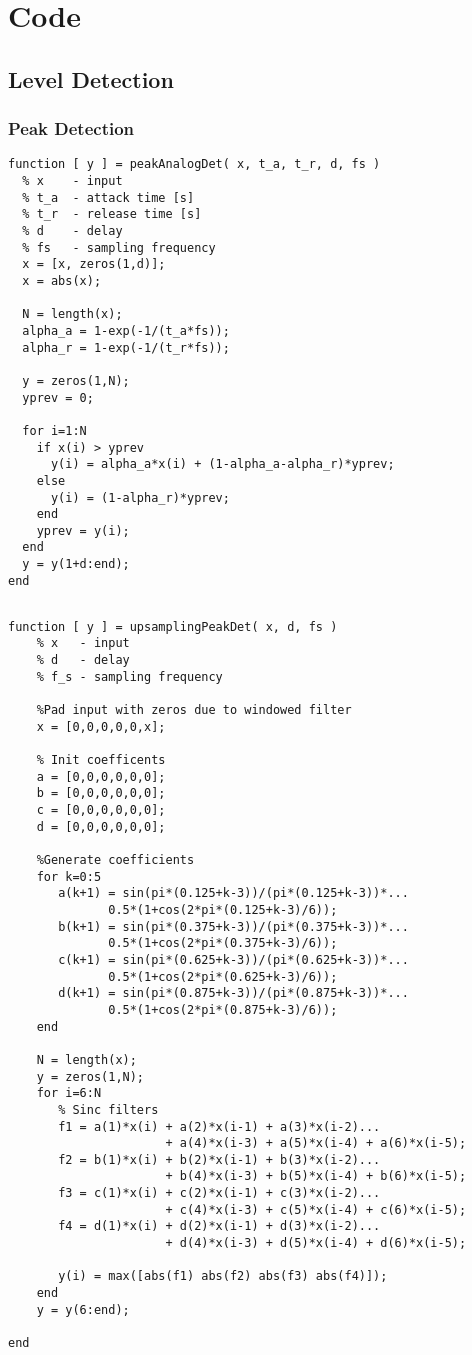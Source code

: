 \documentclass[../main2.tex]{subfiles}
\begin{document}
\section{Code}\label{appendix_code}
\subsection{Level Detection}
\subsubsection{Peak Detection}
\begin{lstlisting}[style=customc]
function [ y ] = peakAnalogDet( x, t_a, t_r, d, fs )
  % x    - input
  % t_a  - attack time [s]
  % t_r  - release time [s]
  % d    - delay
  % fs   - sampling frequency 
  x = [x, zeros(1,d)];
  x = abs(x);
    
  N = length(x);
  alpha_a = 1-exp(-1/(t_a*fs));
  alpha_r = 1-exp(-1/(t_r*fs));
    
  y = zeros(1,N);
  yprev = 0;
  
  for i=1:N
    if x(i) > yprev
      y(i) = alpha_a*x(i) + (1-alpha_a-alpha_r)*yprev;
    else
      y(i) = (1-alpha_r)*yprev;
    end
    yprev = y(i);
  end
  y = y(1+d:end);
end
\end{lstlisting}
\subsection{}
\begin{lstlisting}[style=customc]
function [ y ] = upsamplingPeakDet( x, d, fs )
    % x   - input
    % d   - delay
    % f_s - sampling frequency

    %Pad input with zeros due to windowed filter
    x = [0,0,0,0,0,x];
    
    % Init coefficents
    a = [0,0,0,0,0,0];
    b = [0,0,0,0,0,0];
    c = [0,0,0,0,0,0];
    d = [0,0,0,0,0,0];
    
    %Generate coefficients
    for k=0:5
       a(k+1) = sin(pi*(0.125+k-3))/(pi*(0.125+k-3))*...
              0.5*(1+cos(2*pi*(0.125+k-3)/6));
       b(k+1) = sin(pi*(0.375+k-3))/(pi*(0.375+k-3))*...
              0.5*(1+cos(2*pi*(0.375+k-3)/6));
       c(k+1) = sin(pi*(0.625+k-3))/(pi*(0.625+k-3))*...
              0.5*(1+cos(2*pi*(0.625+k-3)/6));
       d(k+1) = sin(pi*(0.875+k-3))/(pi*(0.875+k-3))*...
              0.5*(1+cos(2*pi*(0.875+k-3)/6));
    end
    
    N = length(x);
    y = zeros(1,N);
    for i=6:N 
       % Sinc filters
       f1 = a(1)*x(i) + a(2)*x(i-1) + a(3)*x(i-2)...
                      + a(4)*x(i-3) + a(5)*x(i-4) + a(6)*x(i-5);
       f2 = b(1)*x(i) + b(2)*x(i-1) + b(3)*x(i-2)...
                      + b(4)*x(i-3) + b(5)*x(i-4) + b(6)*x(i-5);
       f3 = c(1)*x(i) + c(2)*x(i-1) + c(3)*x(i-2)...
                      + c(4)*x(i-3) + c(5)*x(i-4) + c(6)*x(i-5);
       f4 = d(1)*x(i) + d(2)*x(i-1) + d(3)*x(i-2)...
                      + d(4)*x(i-3) + d(5)*x(i-4) + d(6)*x(i-5);
                  
       y(i) = max([abs(f1) abs(f2) abs(f3) abs(f4)]);
    end
    y = y(6:end);
  
end
\end{lstlisting}
\end{document}
